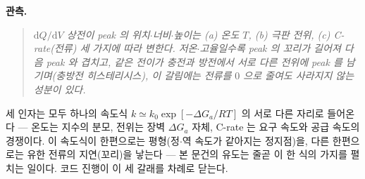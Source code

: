 \documentclass[11pt,a4paper]{article}
\newcommand{\dd}{\mathrm{d}}
\begin{document}
\textbf{관측.}
\begin{quote}\itshape
$\dd Q/\dd V$ 상전이 peak 의 위치$\cdot$너비$\cdot$높이는 (a) 온도 $T$, (b) 극판 전위, (c) C-rate(전류)
세 가지에 따라 변한다. 저온$\cdot$고율일수록 peak 의 꼬리가 길어져 다음 peak 와 겹치고, 같은 전이가 충전과 방전에서
서로 다른 전위에 peak 를 남기며(충방전 히스테리시스), 이 갈림에는 전류를 $0$ 으로 줄여도 사라지지 않는 성분이 있다.
\end{quote}

세 인자는 모두 하나의 속도식 $k\simeq k_0\exp[-\Delta G_a/RT]$ 의 서로 다른 자리로 들어온다 — 온도는 지수의 분모,
전위는 장벽 $\Delta G_a$ 자체, C-rate 는 요구 속도와 공급 속도의 경쟁이다. 이 속도식이 한편으로는 평형(정$\cdot$역
속도가 같아지는 정지점)을, 다른 한편으로는 유한 전류의 지연(꼬리)을 낳는다 — 본 문건의 유도는 줄곧 이 한 식의 가지를
펼치는 일이다. 코드 진행이 이 세 갈래를 차례로 닫는다.
\end{document}
